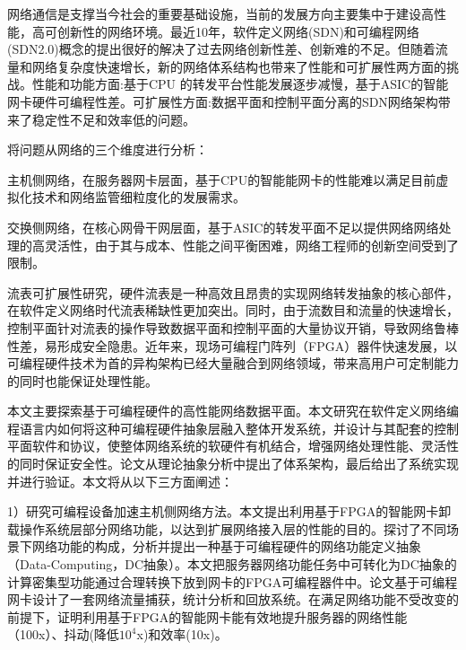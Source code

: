 
\setcounter{page}{1}

%
%
%

网络通信是支撑当今社会的重要基础设施，当前的发展方向主要集中于建设高性能，高可创新性的网络环境。最近10年，软件定义网络(SDN)和可编程网络(SDN2.0)概念的提出很好的解决了过去网络创新性差、创新难的不足。但随着流量和网络复杂度快速增长，新的网络体系结构也带来了性能和可扩展性两方面的挑战。性能和功能方面:基于CPU 的转发平台性能发展逐步减慢，基于ASIC的智能网卡硬件可编程性差。可扩展性方面:数据平面和控制平面分离的SDN网络架构带来了稳定性不足和效率低的问题。

将问题从网络的三个维度进行分析：

主机侧网络，在服务器网卡层面，基于CPU的智能能网卡的性能难以满足目前虚拟化技术和网络监管细粒度化的发展需求。

交换侧网络，在核心网骨干网层面，基于ASIC的转发平面不足以提供网络网络处理的高灵活性，由于其与成本、性能之间平衡困难，网络工程师的创新空间受到了限制。

流表可扩展性研究，硬件流表是一种高效且昂贵的实现网络转发抽象的核心部件，在软件定义网络时代流表稀缺性更加突出。同时，由于流数目和流量的快速增长，控制平面针对流表的操作导致数据平面和控制平面的大量协议开销，导致网络鲁棒性差，易形成安全隐患。近年来，现场可编程门阵列（FPGA）器件快速发展，以可编程硬件技术为首的异构架构已经大量融合到网络领域，带来高用户可定制能力的同时也能保证处理性能。

本文主要探索基于可编程硬件的高性能网络数据平面。本文研究在软件定义网络编程语言内如何将这种可编程硬件抽象层融入整体开发系统，并设计与其配套的控制平面软件和协议，使整体网络系统的软硬件有机结合，增强网络处理性能、灵活性的同时保证安全性。论文从理论抽象分析中提出了体系架构，最后给出了系统实现并进行验证。本文将从以下三方面阐述：

1）研究可编程设备加速主机侧网络方法。本文提出利用基于FPGA的智能网卡卸载操作系统层部分网络功能，以达到扩展网络接入层的性能的目的。探讨了不同场景下网络功能的构成，分析并提出一种基于可编程硬件的网络功能定义抽象（Data-Computing，DC抽象）。本文把服务器网络功能任务中可转化为DC抽象的计算密集型功能通过合理转换下放到网卡的FPGA可编程器件中。论文基于可编程网卡设计了一套网络流量捕获，统计分析和回放系统。在满足网络功能不受改变的前提下，证明利用基于FPGA的智能网卡能有效地提升服务器的网络性能（100x）、抖动(降低$10^4$x)和效率(10x)。

